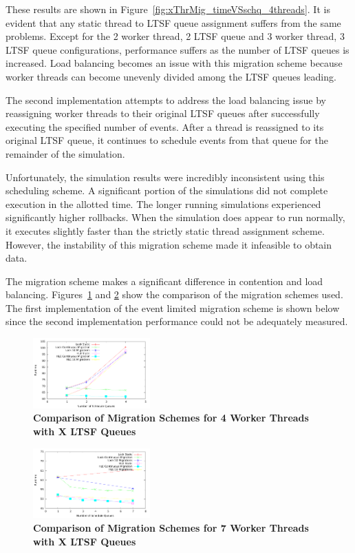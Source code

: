 \documentclass{sig-alternate}
\begin{document}
These results are shown in Figure~\ref{fig:xThrMig_timeVSschq_4threads}.  It is evident
that any static thread to LTSF queue assignment suffers from the same problems.  Except
for the 2 worker thread, 2 LTSF queue and 3 worker thread, 3 LTSF queue configurations,
performance suffers as the number of LTSF queues is increased.  Load balancing becomes an
issue with this migration scheme because worker threads can become unevenly divided among
the LTSF queues leading.

The second implementation attempts to address the load balancing issue by reassigning
worker threads to their original LTSF queues after successfully executing the specified
number of events.  After a thread is reassigned to its original LTSF queue, it continues
to schedule events from that queue for the remainder of the simulation.

Unfortunately, the simulation results were incredibly inconsistent using this scheduling
scheme.  A significant portion of the simulations did not complete execution in the
allotted time.  The longer running simulations experienced significantly higher rollbacks.
When the simulation does appear to run normally, it executes slightly faster than the
strictly static thread assignment scheme.  However, the instability of this migration
scheme made it infeasible to obtain data.

The migration scheme makes a significant difference in contention and load balancing.
Figures~\ref{fig:migComp_4threads} and \ref{fig:migComp_7threads} show the comparison of
the migration schemes used.  The first implementation of the event limited migration
scheme is shown below since the second implementation performance could not be adequately
measured.

\begin{figure}
    \centering
    \graphicspath{ {./figures/} }
    \includegraphics[width=0.4\textwidth,keepaspectratio]{migComp_4threads}
    \caption{\textbf{Comparison of Migration Schemes for 4 Worker Threads with X LTSF
        Queues}}\label{fig:migComp_4threads}
\end{figure}

\begin{figure}
    \centering
    \graphicspath{ {./figures/} }
    \includegraphics[width=0.4\textwidth,keepaspectratio]{migComp_7threads}
    \caption{\textbf{Comparison of Migration Schemes for 7 Worker Threads with X LTSF
        Queues}}\label{fig:migComp_7threads}
\end{figure}
\end{document}
